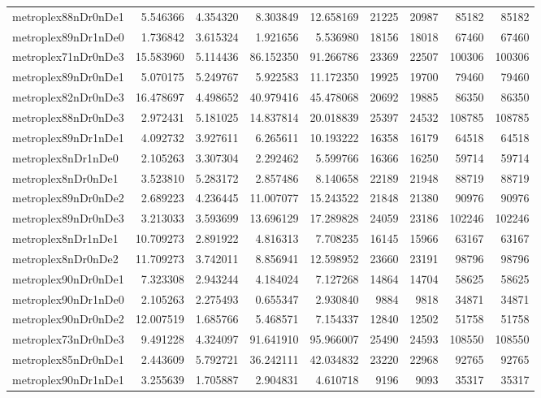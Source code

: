 \begin{longtable}{|l|r|r|r|r|r|r|r|r|}
metroplex88nDr0nDe1 & 5.546366 & 4.354320 & 8.303849 & 12.658169 & 21225 & 20987 & 85182 & 85182 \\
metroplex89nDr1nDe0 & 1.736842 & 3.615324 & 1.921656 & 5.536980 & 18156 & 18018 & 67460 & 67460 \\
metroplex71nDr0nDe3 & 15.583960 & 5.114436 & 86.152350 & 91.266786 & 23369 & 22507 & 100306 & 100306 \\
metroplex89nDr0nDe1 & 5.070175 & 5.249767 & 5.922583 & 11.172350 & 19925 & 19700 & 79460 & 79460 \\
metroplex82nDr0nDe3 & 16.478697 & 4.498652 & 40.979416 & 45.478068 & 20692 & 19885 & 86350 & 86350 \\
metroplex88nDr0nDe3 & 2.972431 & 5.181025 & 14.837814 & 20.018839 & 25397 & 24532 & 108785 & 108785 \\
metroplex89nDr1nDe1 & 4.092732 & 3.927611 & 6.265611 & 10.193222 & 16358 & 16179 & 64518 & 64518 \\
metroplex8nDr1nDe0 & 2.105263 & 3.307304 & 2.292462 & 5.599766 & 16366 & 16250 & 59714 & 59714 \\
metroplex8nDr0nDe1 & 3.523810 & 5.283172 & 2.857486 & 8.140658 & 22189 & 21948 & 88719 & 88719 \\
metroplex89nDr0nDe2 & 2.689223 & 4.236445 & 11.007077 & 15.243522 & 21848 & 21380 & 90976 & 90976 \\
metroplex89nDr0nDe3 & 3.213033 & 3.593699 & 13.696129 & 17.289828 & 24059 & 23186 & 102246 & 102246 \\
metroplex8nDr1nDe1 & 10.709273 & 2.891922 & 4.816313 & 7.708235 & 16145 & 15966 & 63167 & 63167 \\
metroplex8nDr0nDe2 & 11.709273 & 3.742011 & 8.856941 & 12.598952 & 23660 & 23191 & 98796 & 98796 \\
metroplex90nDr0nDe1 & 7.323308 & 2.943244 & 4.184024 & 7.127268 & 14864 & 14704 & 58625 & 58625 \\
metroplex90nDr1nDe0 & 2.105263 & 2.275493 & 0.655347 & 2.930840 & 9884 & 9818 & 34871 & 34871 \\
metroplex90nDr0nDe2 & 12.007519 & 1.685766 & 5.468571 & 7.154337 & 12840 & 12502 & 51758 & 51758 \\
metroplex73nDr0nDe3 & 9.491228 & 4.324097 & 91.641910 & 95.966007 & 25490 & 24593 & 108550 & 108550 \\
metroplex85nDr0nDe1 & 2.443609 & 5.792721 & 36.242111 & 42.034832 & 23220 & 22968 & 92765 & 92765 \\
metroplex90nDr1nDe1 & 3.255639 & 1.705887 & 2.904831 & 4.610718 & 9196 & 9093 & 35317 & 35317 \\

\end{longtable}
